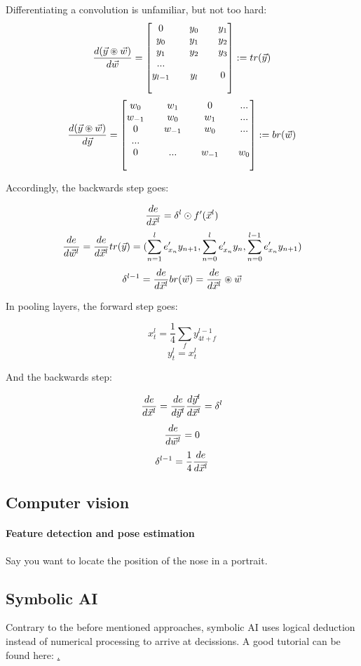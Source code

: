 Differentiating a convolution is unfamiliar, but not too hard: 
$$  \frac{ \mathop{d(\vec{y} \circledast \vec{w})} }{ \mathop{d\vec{w}} }  =  \begin{bmatrix} 
	0   && y_0 && y_1 \\
	y_0 && y_1 && y_2 \\
	y_1 && y_2 && y_3 \\
	... \\
	y_{l-1} && y_l && 0 \\
 \\ \end{bmatrix}  := tr(\vec{y}) $$
$$  \frac{ \mathop{d(\vec{y} \circledast \vec{w})} }{ \mathop{d\vec{y}} }  =  \begin{bmatrix} 
	w_0    && w_1    && 0   && ... \\
	w_{-1} && w_0    && w_1 && ... \\
	0      && w_{-1} && w_0 && ... \\
	...    \\
	0      && ...    && w_{-1} && w_0 \\
 \\ \end{bmatrix}  := br(\vec{w}) $$



Accordingly, the backwards step goes:

$$  \frac{ \mathop{de} }{ \mathop{d\vec{x}^l} }  = \delta^l \odot f'(\vec{x}^l) $$
$$  \frac{ \mathop{de} }{ \mathop{d\vec{w}^l} }  =  \frac{ \mathop{de} }{ \mathop{d\vec{x}^l} }  tr(\vec{y}) = (\sum_{n=1}^l e'_{x_n} y_{n+1}, \sum_{n=0}^l e'_{x_n} y_n, \sum_{n=0}^{l-1} e'_{x_n} y_{n+1}) $$
$$ \delta^{l-1} =  \frac{ \mathop{de} }{ \mathop{d\vec{x}^l} }  br(\vec{w}) =  \frac{ \mathop{de} }{ \mathop{d\vec{x}^l} }  \circledast \vec{w} $$

In pooling layers, the forward step goes: 

$$ x_t^l = \frac{1}{4} \sum_f y_{4t + f}^{l-1} $$
$$ y_t^l = x_t^l $$

And the  backwards step: 

$$  \frac{ \mathop{de} }{ \mathop{d\vec{x}^l} }  =  \frac{ \mathop{de} }{ \mathop{d\vec{y}^l} }   \frac{ \mathop{d\vec{y}^l} }{ \mathop{d\vec{x}^l} }   = \delta^l  $$
$$  \frac{ \mathop{de} }{ \mathop{d\vec{w}^l} }  = 0 $$
$$ \delta^{l-1} = \frac{1}{4}  \frac{ \mathop{de} }{ \mathop{d\vec{x}^l} }   $$

\subsection{Computer vision}

\paragraph{Feature detection and pose estimation}

Say you want to locate the position of the nose in a portrait. 



\subsection{Symbolic AI}

Contrary to the before mentioned approaches, symbolic AI uses logical deduction instead of numerical processing to arrive at decissions. A good tutorial can be found here: \href{codeproject.com/Articles/179375/Man-Marriage-and-Machine-Adventures-in-Artificia}.

